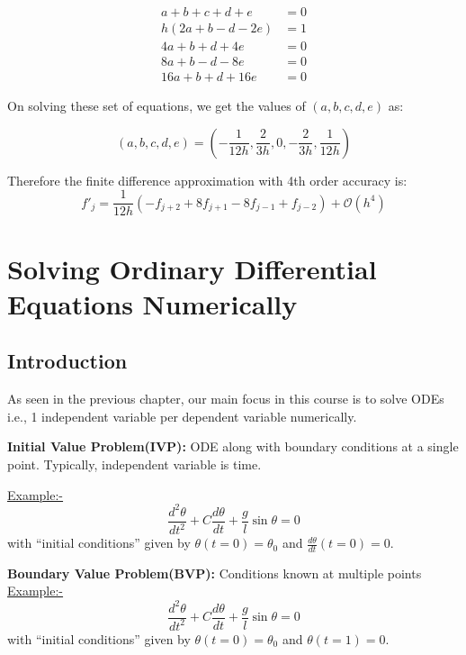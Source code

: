 \documentclass[
]{book}
\begin{document}
\begin{align}
a+b+c+d+e &=0\\
h(2a+b-d-2e) &=1\\
4a+b+d+4e &=0\\
8a+b-d-8e &=0\\
16a+b+d+16e &=0
\end{align}

On solving these set of equations, we get the values of \((a,b,c,d,e)\) as:

\begin{equation}
(a,b,c,d,e) = \left(-\frac{1}{12h}, \frac{2}{3h}, 0 , -\frac{2}{3h}, \frac{1}{12h} \right)
\end{equation}

Therefore the finite difference approximation with 4th order accuracy is:
\begin{equation}
f'_j = \frac{1}{12h}(-f_{j+2}+8f_{j+1}-8f_{j-1}+f_{j-2}) + \mathcal{O}(h^4)
\end{equation}

\hypertarget{solving-ordinary-differential-equations-numerically}{%
\chapter{Solving Ordinary Differential Equations Numerically}\label{solving-ordinary-differential-equations-numerically}}

\hypertarget{introduction-2}{%
\section{Introduction}\label{introduction-2}}

As seen in the previous chapter, our main focus in this course is to solve ODEs i.e., 1 independent variable per dependent variable numerically.

\textbf{Initial Value Problem(IVP):} ODE along with boundary conditions at a single point. Typically, independent variable is time.

\url{Example:-}
\begin{equation}
    \frac{d^2\theta}{dt^2}+C\frac{d\theta}{dt}+\frac{g}{l}\sin \theta = 0
\end{equation}
with ``initial conditions'' given by \(\theta(t=0)= \theta_0\) and \(\frac{d\theta}{dt}(t=0) = 0\).

\textbf{Boundary Value Problem(BVP):} Conditions known at multiple points
\url{Example:-}
\begin{equation}
    \frac{d^2\theta}{dt^2}+C\frac{d\theta}{dt}+\frac{g}{l}\sin \theta = 0
\end{equation}
with ``initial conditions'' given by \(\theta(t=0)= \theta_0\) and \(\theta(t=1) = 0\).
\end{document}
